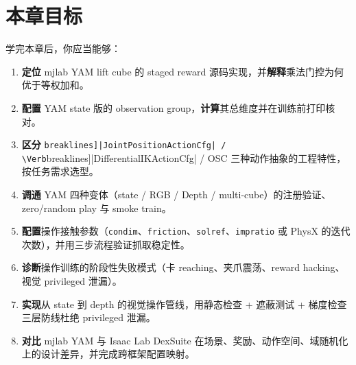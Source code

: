 \begin{practice}
\end{practice}

\section*{本章目标}
\label{sec:rlmc-manip-goals}

学完本章后，你应当能够：

\begin{enumerate}
  \item \textbf{定位} mjlab YAM lift cube 的 staged reward 源码实现，并\textbf{解释}乘法门控为何优于等权加和。
  \item \textbf{配置} YAM state 版的 observation group，\textbf{计算}其总维度并在训练前打印核对。
  \item \textbf{区分} \Verb[breaklines]|JointPositionActionCfg| / \Verb[breaklines]|DifferentialIKActionCfg| / OSC 三种动作抽象的工程特性，按任务需求选型。
  \item \textbf{调通} YAM 四种变体（state / RGB / Depth / multi-cube）的注册验证、zero/random play 与 smoke train。
  \item \textbf{配置}操作接触参数（\verb|condim|、\verb|friction|、\verb|solref|、\verb|impratio| 或 PhysX 的迭代次数），并用三步流程验证抓取稳定性。
  \item \textbf{诊断}操作训练的阶段性失败模式（卡 reaching、夹爪震荡、reward hacking、视觉 privileged 泄漏）。
  \item \textbf{实现}从 state 到 depth 的视觉操作管线，用静态检查 + 遮蔽测试 + 梯度检查三层防线杜绝 privileged 泄漏。
  \item \textbf{对比} mjlab YAM 与 Isaac Lab DexSuite 在场景、奖励、动作空间、域随机化上的设计差异，并完成跨框架配置映射。
\end{enumerate}

